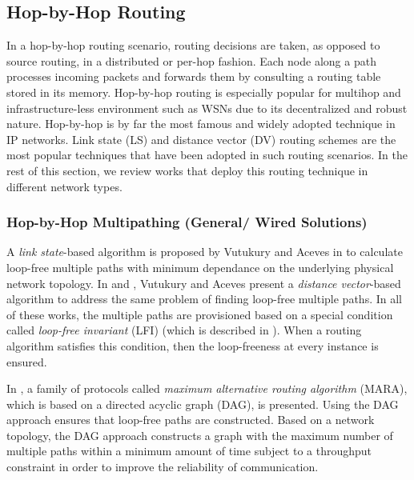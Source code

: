 \documentclass[10pt]{IEEEtran}
\begin{document}
\subsection{Hop-by-Hop Routing}
\label{subsec:hop-by-hop}

In a hop-by-hop routing scenario, routing decisions are taken, as opposed to source routing, in a distributed or per-hop fashion. Each node along a path processes incoming packets and forwards them by consulting a routing table stored in its memory. Hop-by-hop routing is especially popular for multihop and infrastructure-less environment such as WSNs due to its decentralized and robust nature. Hop-by-hop is by far the most famous and widely adopted technique in IP networks. Link state (LS) and distance vector (DV) routing schemes are the most popular techniques that have been adopted in such routing scenarios. In the rest of this section, we review works that deploy this routing technique in different network types.

\vspace{2mm}
\subsubsection{Hop-by-Hop Multipathing (General/ Wired Solutions)}
\label{subsub: w_g_hop}

A \textit{link state}-based algorithm is proposed by Vutukury and Aceves in \cite{vutukury1999simple} to calculate loop-free multiple paths with minimum dependance on the underlying physical network topology. In \cite{vutukury1999algorithm} and \cite{vutukury2001mdva}, Vutukury and Aceves present a \textit{distance vector}-based algorithm to address the same problem of finding loop-free multiple paths. In all of these works, the multiple paths are provisioned based on a special condition called \textit{loop-free invariant} (LFI) (which is described in \cite{vutukury1999simple}). When a routing algorithm satisfies this condition, then the loop-freeness at every instance is ensured.

In \cite{ohara2009mara}, a family of protocols called \textit{maximum alternative routing algorithm} (MARA), which is based on a directed acyclic graph (DAG), is presented. Using the DAG approach ensures that loop-free paths are constructed. Based on a network topology, the DAG approach constructs a graph with the maximum number of multiple paths within a minimum amount of time subject to a throughput constraint in order to improve the reliability of communication.
\end{document}
